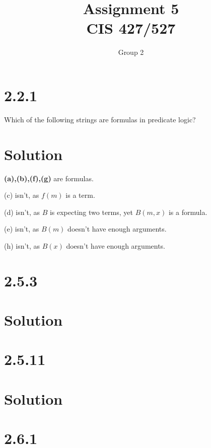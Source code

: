 \documentclass[10pt]{article}
\begin{document}
\title{Assignment \raisebox{.22ex}{\large\#}5 \\
	CIS 427/527}
\author{Group 2}

\maketitle

\section*{2.2.1}
Which of the following strings are formulas in predicate logic?
\section*{Solution}
\textbf{(a),(b),(f),(g)} are formulas.
\begin{description*}
\item[(c)] isn't, as $f(m)$ is a term.
\item[(d)] isn't, as $B$ is expecting two terms, yet $B(m,x)$ is a formula.
\item[(e)] isn't, as $B(m)$ doesn't have enough arguments.
\item[(h)] isn't, as $B(x)$ doesn't have enough arguments.
\end{description*}
\section*{2.5.3}

\section*{Solution}

\section*{2.5.11}

\section*{Solution}

\section*{2.6.1}
\end{document}
